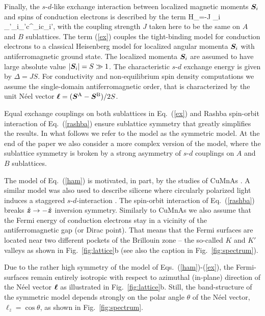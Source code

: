 Finally, the $s$-$d$-like exchange interaction between localized magnetic moments $\boldsymbol{S}_i$ and spins of conduction electrons is described by the term
\be
\label{ex}
H_=-J \s_{i} \s_{\sigma\sigma'}_i\cdot \bb{\sigma}_{\sigma\sigma'}c^\dagger_{i\sigma}c\0_{i\sigma'},
\e
with the coupling strength $J$ taken here to be the same on $A$ and $B$ sublattices. The term (\ref{ex}) couples the tight-binding model for conduction electrons to a  classical Heisenberg model for localized angular momenta $\boldsymbol{S}_i$ with antiferromagnetic ground state. The localized momenta $\boldsymbol{S}_i$ are assumed to have large absolute value $|\boldsymbol{S}_i|=S\gg 1$. The characteristic $s$-$d$ exchange energy is given by $\Delta = J S$.  For conductivity and non-equilibrium spin density computations we assume the single-domain antiferromagnetic order, that is characterized by the unit N\'eel vector $\boldsymbol{\ell} = (\boldsymbol{S}^\text{A}-\boldsymbol{S}^\text{B})/2S$. 

Equal exchange couplings on both sublattices in Eq.~(\ref{ex}) and Rashba spin-orbit interaction of Eq.~(\ref{rashba}) ensure sublattice symmetry that greatly simplifies the results. In what follows we refer to the model as the symmetric model. At the end of the paper we also consider a more complex version of the model, where the sublattice symmetry is broken by a strong asymmetry of $s$-$d$ couplings on $A$ and $B$ sublattices.
 
The model of Eq.~(\ref{ham}) is motivated, in part, by the studies of CuMnAs \cite{SmejkalAFM_2017}. A similar model was also used to describe silicene where circularly polarized light induces a staggered $s$-$d$-interaction \cite{ezawa_photoinduced_2013}. The spin-orbit interaction of Eq.~(\ref{rashba}) breaks $\hat{\boldsymbol{z}}\to -\hat{\boldsymbol{z}}$ inversion symmetry. Similarly to CuMnAs we also assume that the Fermi energy of conduction electrons stay in a vicinity of the antiferromagnetic gap (or Dirac point). That means that the Fermi surfaces are located near two different pockets of the Brillouin zone -- the so-called $K$ and $K'$ valleys as shown in Fig.~\ref{fig:lattice}b (see also the caption in Fig.~\ref{fig:spectrum}). 

Due to the rather high symmetry of the model of Eqs.~(\ref{ham})-(\ref{ex}), the Fermi-surfaces remain entirely isotropic with respect to azimuthal (in-plane) direction of the N\'eel vector $\boldsymbol{\ell}$ as illustrated in Fig.~\ref{fig:lattice}b. Still, the band-structure of the symmetric model depends strongly on the polar angle $\theta$ of the N\'eel vector, $\ell_z= \cos\theta$, as shown in Fig.~\ref{fig:spectrum}.


